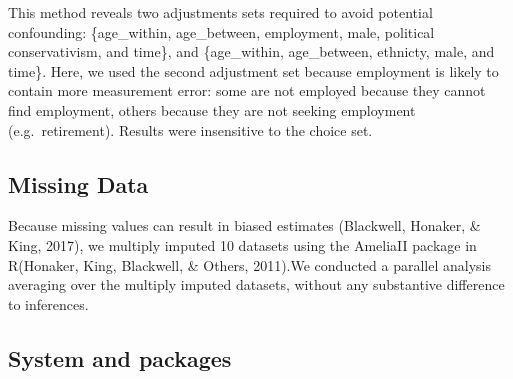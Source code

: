 \documentclass[
  english,
  man,floatsintext]{apa6}
\begin{document}
This method reveals two adjustments sets required to avoid potential confounding: \{age\_within, age\_between, employment, male, political conservativism, and time\}, and \{age\_within, age\_between, ethnicty, male, and time\}. Here, we used the second adjustment set because employment is likely to contain more measurement error: some are not employed because they cannot find employment, others because they are not seeking employment (e.g.~retirement). Results were insensitive to the choice set.

\hypertarget{missing-data}{%
\subsection{Missing Data}\label{missing-data}}

Because missing values can result in biased estimates (Blackwell, Honaker, \& King, 2017), we multiply imputed 10 datasets using the AmeliaII package in R(Honaker, King, Blackwell, \& Others, 2011).We conducted a parallel analysis averaging over the multiply imputed datasets, without any substantive difference to inferences.

\hypertarget{system-and-packages}{%
\subsection{System and packages}\label{system-and-packages}}
\end{document}
